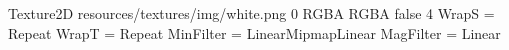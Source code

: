 Texture2D
resources/textures/img/white.png
0
RGBA
RGBA
false
4
WrapS = Repeat
WrapT = Repeat
MinFilter = LinearMipmapLinear
MagFilter = Linear
